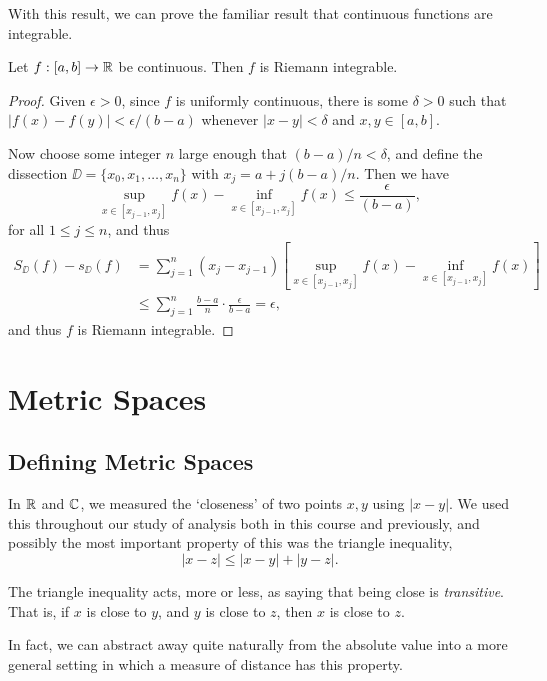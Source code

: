 \documentclass[a4paper]{scrartcl}
\begin{document}
With this result, we can prove the familiar result that continuous functions are integrable.

\begin{theorem}
	Let $f:[a, b] \rightarrow \mathbb{R}$ be continuous. Then $f$ is Riemann integrable.
\end{theorem}
\begin{proof}
	Given $\epsilon > 0$, since $f$ is uniformly continuous, there is some $\delta > 0$ such that $|f(x) - f(y)| < \epsilon/(b - a)$ whenever $|x - y| < \delta$ and $x, y \in [a, b]$.

	Now choose some integer $n$ large enough that $(b - a)/n < \delta$, and define the dissection $\DD = \{x_0, x_1, \dots, x_n\}$ with $x_j = a + j(b - a)/n$. Then we have
	$$
	\sup_{x \in [x_{j - 1}, x_j]} f(x) - \inf_{x \in [x_{j - 1}, x_j]} f(x) \leq \frac{\epsilon}{(b - a)},
	$$
	for all $1 \leq j \leq n$, and thus 
	\begin{align*}
		S_\DD(f) - s_\DD(f) &= \sum_{j = 1}^n (x_j - x_{j - 1})\left[\sup_{x \in [x_{j - 1}, x_j]} f(x) - \inf_{x \in [x_{j - 1}, x_j]} f(x)\right] \\
		&\leq \sum_{j = 1}^n \frac{b - a}{n} \cdot \frac{\epsilon}{b - a} = \epsilon,
	\end{align*}
	and thus $f$ is Riemann integrable.
\end{proof}

\section{Metric Spaces}

\subsection{Defining Metric Spaces}

In $\mathbb{R}$ and $\mathbb{C}$, we measured the `closeness' of two points $x, y$ using $|x - y|$. We used this throughout our study of analysis both in this course and previously, and possibly the most important property of this was the triangle inequality,
$$
|x - z| \leq |x - y| + |y - z|.
$$

The triangle inequality acts, more or less, as saying that being close is \emph{transitive}. That is, if $x$ is close to $y$, and $y$ is close to $z$, then $x$ is close to $z$.

In fact, we can abstract away quite naturally from the absolute value into a more general setting in which a measure of distance has this property.
\end{document}
